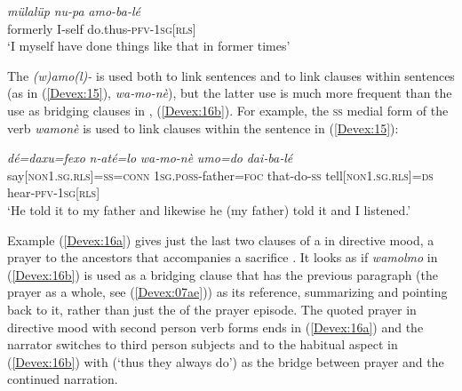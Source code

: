 \documentclass[output=paper]{LSP/langsci}
\begin{document}
\begin{exe}
\ex \label{Devex:14}
\gll \textit{mülalüp} \textit{nu-pa} \textit{amo-ba-lé}\\
formerly I-self do.thus-\textsc{pfv-1sg[rls]}\\
\glt `I myself have done things like that in former times'\\      	
\end{exe}

The  \textit{(w)amo(l)-} is used both to link sentences and to link clauses within sentences (as in (\ref{Devex:15}), \textit{wa‑mo-nè}), but the latter use is much more frequent than the use as bridging clauses in , (\ref{Devex:16b}). For example, the \textsc{ss} medial form of the verb \textit{wamonè} is used to link clauses within the sentence in (\ref{Devex:15}):


\begin{exe}
\ex \label{Devex:15}	     
\gll \textit{dé=daxu=fexo} \textit{n‑até=lo} \textit{wa‑mo-nè} \textit{umo=do} \textit{dai‑ba‑lé}\\
say[\textsc{non1.sg.rls}]=\textsc{ss=conn} \textsc{1sg.poss}‑father=\textsc{foc} that-do-\textsc{ss}  		tell[\textsc{non1.sg.rls}]=\textsc{ds} hear‑\textsc{pfv‑1sg[rls]}\\
\glt `He told it to my father and likewise he (my father) told it and I listened.'\\	     
\end{exe}
	     
Example (\ref{Devex:16a}) gives just the last two clauses of a  in directive mood, a prayer to the ancestors that accompanies a sacrifice \citep[see examples (8)-(22) in][160--162]{enk97}. It looks as if \textit{wamolmo} in (\ref{Devex:16b}) is used as a bridging clause that has the previous paragraph (the prayer as a whole, see (\ref{Devex:07ae})) as its reference, summarizing and pointing back to it, rather than just the  of the prayer episode. The quoted prayer in directive mood with second person verb forms ends in (\ref{Devex:16a}) and the narrator switches to third person subjects and to the habitual aspect in (\ref{Devex:16b}) with  (`thus they always do') as the bridge between prayer and the continued narration.
	     
\end{document}
